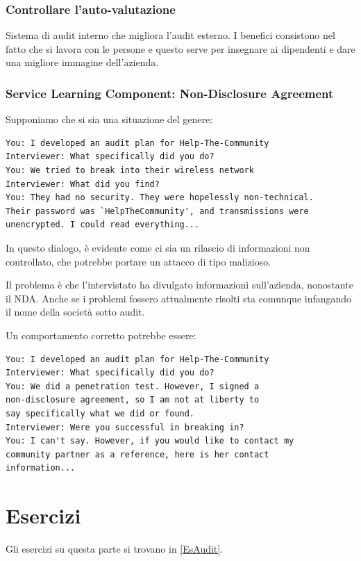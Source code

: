 \subsubsection{Controllare l'auto-valutazione}

Sistema di audit interno che migliora l'audit esterno. I benefici consistono
nel fatto che si lavora con le persone e questo serve per insegnare ai
dipendenti e dare una migliore immagine dell'azienda.


\subsubsection{Service Learning Component: Non-Disclosure Agreement}

Supponiamo che si sia una situazione del genere:

\begin{verbatim}
You: I developed an audit plan for Help-The-Community
Interviewer: What specifically did you do?
You: We tried to break into their wireless network
Interviewer: What did you find?
You: They had no security. They were hopelessly non-technical.
Their password was `HelpTheCommunity', and transmissions were
unencrypted. I could read everything...
\end{verbatim}

In questo dialogo, è evidente come ci sia un rilascio di informazioni non
controllato, che potrebbe portare un attacco di tipo malizioso.

Il problema è che l'intervistato ha divulgato informazioni sull'azienda,
nonostante il NDA. Anche se i problemi fossero attualmente risolti sta comunque
infangando il nome della società sotto audit.


Un comportamento corretto potrebbe essere:
\begin{verbatim}
You: I developed an audit plan for Help-The-Community
Interviewer: What specifically did you do?
You: We did a penetration test. However, I signed a
non-disclosure agreement, so I am not at liberty to
say specifically what we did or found.
Interviewer: Were you successful in breaking in?
You: I can't say. However, if you would like to contact my
community partner as a reference, here is her contact
information...
\end{verbatim}

\section{Esercizi}
Gli esercizi su questa parte si trovano in \ref{EsAudit}.


